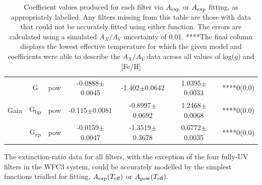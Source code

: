 \documentclass[12pt, a4paper]{report}
\begin{document}
\begin{table}
\begin{center}
{\begin{tabular}{ccccccc}
& G & pow & -0.0888$\pm$0.0045 & -1.402$\pm$0.0642 & 1.0395$\pm$0.0033 & ****0(0.0) \\
Gaia & G\textsubscript{bp} & pow & -0.115$\pm$0.0081 & -0.8997$\pm$0.0692 & 1.2468$\pm$0.0068 & ****0(0.0) \\
& G\textsubscript{rp} & pow & -0.0159$\pm$0.0047 & -1.3519$\pm$0.3678 & 0.6772$\pm$0.0035 & ****0(0.0) \\ \hline

\end{tabular}}
\caption{Coefficient values produced for each filter via $A_{\textnormal{exp}}$ or $A_{\textnormal{exp}}$ fitting, as appropriately labelled. Any filters missing from this table are those with data that could not be accurately fitted using either function. The errors are calculated using a simulated $A_{X}/A_{V}$ uncertainty of 0.01. ****The final column displays the lowest effective temperature for which the given model and coefficients were able to describe the $A_{X}/A_{V}$ data across all values of log($g$) and [Fe/H]}
\label{simpfunc_coeffs_table}
\end{center}
\end{table}

The extinction-ratio data for all filters, with the exception of the four fully-UV filters in the WFC3 system, could be accurately modelled by the simplest functions trialled for fitting, $A_{\textnormal{exp}} (T_{\textnormal{eff}})$ or $A_{\textnormal{pow}} (T_{\textnormal{eff}})$.
\end{document}
